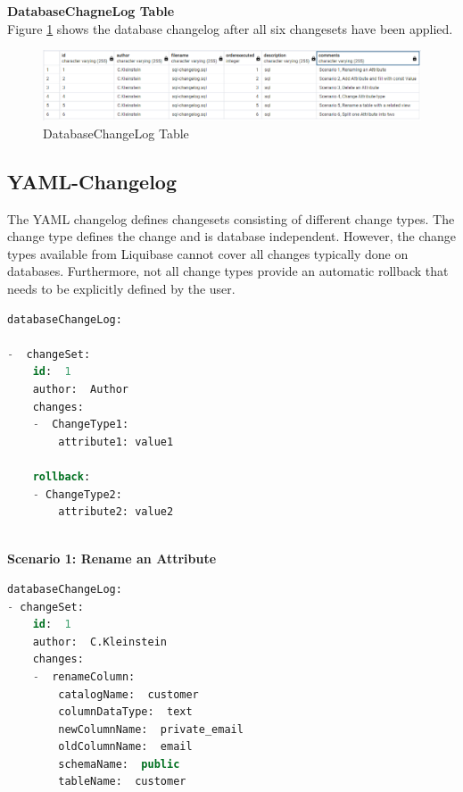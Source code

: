 \textbf{DatabaseChagneLog Table}\\
%
Figure \ref{fig:scenarios:LiquibaseDBCLSQL} shows the database changelog after all six changesets have been applied.

\begin{figure}[H]
	\centering
	\includegraphics[width=\textwidth]{./chapters/scenarios/images/databasechangelogSQL}
	\caption[DatabaseChangeLog Table - Source: Own illustration]{DatabaseChangeLog Table}
	\label{fig:scenarios:LiquibaseDBCLSQL}
\end{figure}

\subsection{YAML-Changelog}
%
The YAML changelog defines changesets consisting of different change types. The change type defines the change and is database independent. However, the change types available from Liquibase cannot cover all changes typically done on databases. Furthermore, not all change types provide an automatic rollback that needs to be explicitly defined by the user.
\newpage

\begin{lstlisting}[language=SQL, caption={YAML Changelog with Example Changeset}, label=list:scenarios:LiquibaseYAMLChangesetExample]
databaseChangeLog:  

-  changeSet:  
	id:  1  
	author:  Author 
	changes:  
	-  ChangeType1:
		attribute1: value1
		
	rollback:  
	- ChangeType2:
		attribute2: value2
 
\end{lstlisting}

\textbf{Scenario 1: Rename an Attribute}\\
%
\begin{lstlisting}[language=SQL, caption={YAML Changeset Scenario 1: Rename an Attribute}, label=list:scenarions:LiquibaseYAMLScen1]
databaseChangeLog:
- changeSet:  
	id:  1  
	author:  C.Kleinstein  
	changes:  
	-  renameColumn:  
		catalogName:  customer  
		columnDataType:  text  
		newColumnName:  private_email  
		oldColumnName:  email  
		schemaName:  public  
		tableName:  customer
\end{lstlisting}

